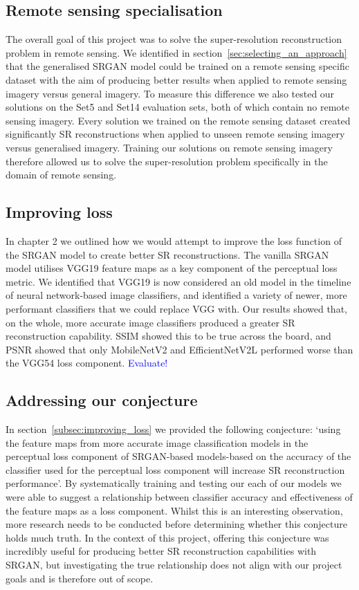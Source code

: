 \subsection{Remote sensing specialisation}
The overall goal of this project was to solve the super-resolution reconstruction problem in remote sensing. We identified in section~\ref{sec:selecting_an_approach} that the generalised SRGAN model could be trained on a remote sensing specific dataset with the aim of producing better results when applied to remote sensing imagery versus general imagery. To measure this difference we also tested our solutions on the Set5 and Set14 evaluation sets, both of which contain no remote sensing imagery. Every solution we trained on the remote sensing dataset created significantly SR reconstructions when applied to unseen remote sensing imagery versus generalised imagery. Training our solutions on remote sensing imagery therefore allowed us to solve the super-resolution problem specifically in the domain of remote sensing.

\subsection{Improving loss}
In chapter 2 we outlined how we would attempt to improve the loss function of the SRGAN model to create better SR reconstructions. The vanilla SRGAN model utilises VGG19 feature maps as a key component of the perceptual loss metric. We identified that VGG19 is now considered an old model in the timeline of neural network-based image classifiers, and identified a variety of newer, more performant classifiers that we could replace VGG with. Our results showed that, on the whole, more accurate image classifiers produced a greater SR reconstruction capability. SSIM showed this to be true across the board, and PSNR showed that only MobileNetV2 and EfficientNetV2L performed worse than the VGG54 loss component. \textcolor{blue}{Evaluate!}

\subsection{Addressing our conjecture}
In section~\ref{subsec:improving_loss} we provided the following conjecture: `using the feature maps from more accurate image classification models in the perceptual loss component of SRGAN-based models-based on the accuracy of the classifier used for the perceptual loss component will increase SR reconstruction performance'. By systematically training and testing our each of our models we were able to suggest a relationship between classifier accuracy and effectiveness of the feature maps as a loss component. Whilst this is an interesting observation, more research needs to be conducted before determining whether this conjecture holds much truth. In the context of this project, offering this conjecture was incredibly useful for producing better SR reconstruction capabilities with SRGAN, but investigating the true relationship does not align with our project goals and is therefore out of scope.

